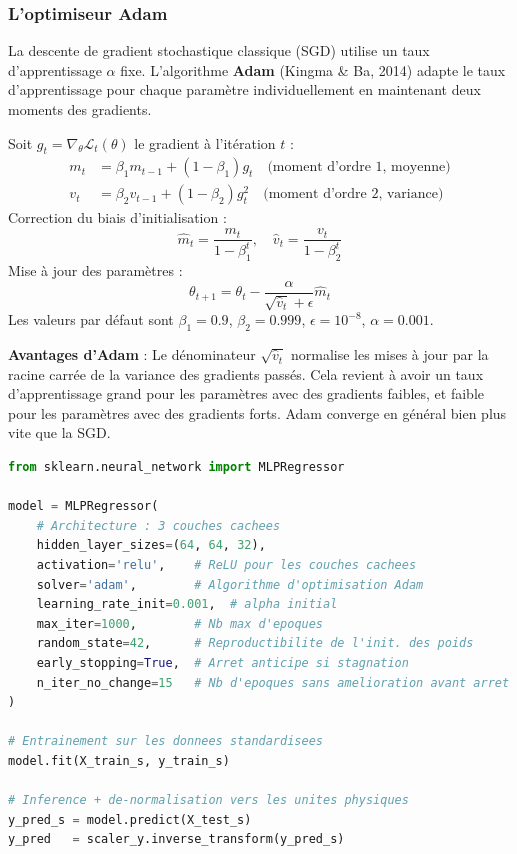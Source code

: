 \documentclass[journal, a4paper, twocolumn]{IEEEtran}
\begin{document}
\subsubsection{L'optimiseur Adam}

La descente de gradient stochastique classique (SGD) utilise un taux d'apprentissage $\alpha$ fixe. L'algorithme \textbf{Adam} (Kingma \& Ba, 2014) adapte le taux d'apprentissage pour chaque paramètre individuellement en maintenant deux moments des gradients.

Soit $g_t = \nabla_\theta \mathcal{L}_t(\theta)$ le gradient à l'itération $t$ :
\begin{align}
    m_t &= \beta_1 m_{t-1} + (1-\beta_1) g_t \quad \text{(moment d'ordre 1, moyenne)} \\
    v_t &= \beta_2 v_{t-1} + (1-\beta_2) g_t^2 \quad \text{(moment d'ordre 2, variance)}
\end{align}
Correction du biais d'initialisation :
\begin{equation}
    \hat{m}_t = \frac{m_t}{1-\beta_1^t}, \quad \hat{v}_t = \frac{v_t}{1-\beta_2^t}
\end{equation}
Mise à jour des paramètres :
\begin{equation}
    \theta_{t+1} = \theta_t - \frac{\alpha}{\sqrt{\hat{v}_t} + \epsilon} \hat{m}_t
\end{equation}
Les valeurs par défaut sont $\beta_1 = 0.9$, $\beta_2 = 0.999$, $\epsilon = 10^{-8}$, $\alpha = 0.001$.

\textbf{Avantages d'Adam} : Le dénominateur $\sqrt{\hat{v}_t}$ normalise les mises à jour par la racine carrée de la variance des gradients passés. Cela revient à avoir un taux d'apprentissage grand pour les paramètres avec des gradients faibles, et faible pour les paramètres avec des gradients forts. Adam converge en général bien plus vite que la SGD.

\begin{lstlisting}[language=Python, caption=Definition et entrainement du MLP avec scikit-learn]
from sklearn.neural_network import MLPRegressor

model = MLPRegressor(
    # Architecture : 3 couches cachees
    hidden_layer_sizes=(64, 64, 32),
    activation='relu',    # ReLU pour les couches cachees
    solver='adam',        # Algorithme d'optimisation Adam
    learning_rate_init=0.001,  # alpha initial
    max_iter=1000,        # Nb max d'epoques
    random_state=42,      # Reproductibilite de l'init. des poids
    early_stopping=True,  # Arret anticipe si stagnation
    n_iter_no_change=15   # Nb d'epoques sans amelioration avant arret
)

# Entrainement sur les donnees standardisees
model.fit(X_train_s, y_train_s)

# Inference + de-normalisation vers les unites physiques
y_pred_s = model.predict(X_test_s)
y_pred   = scaler_y.inverse_transform(y_pred_s)
\end{lstlisting}
\end{document}
